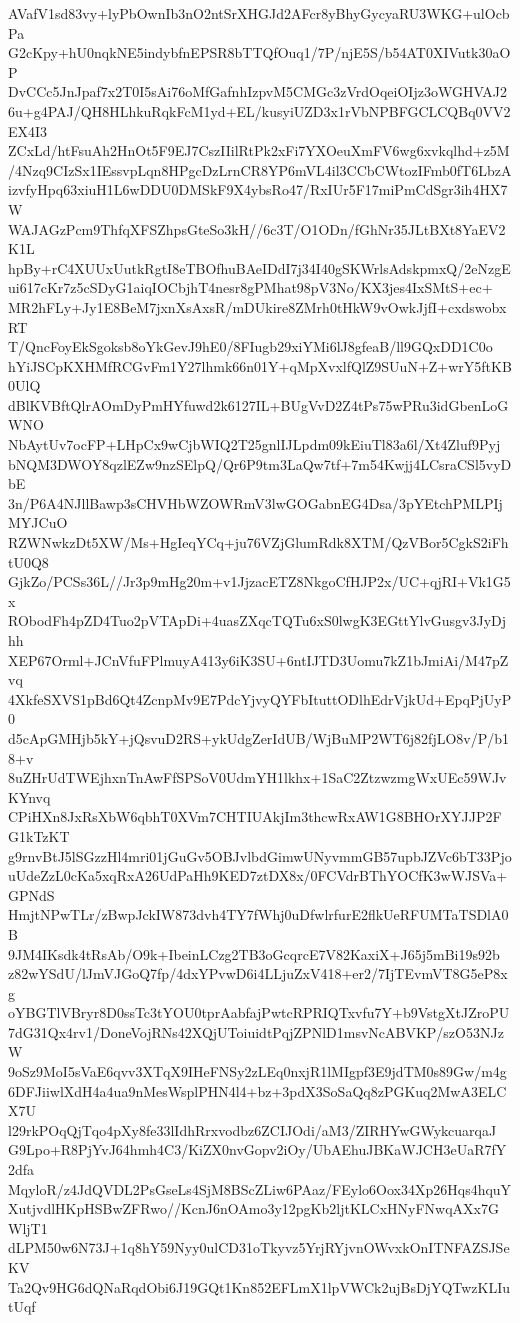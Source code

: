 AVafV1sd83vy+lyPbOwnIb3nO2ntSrXHGJd2AFcr8yBhyGycyaRU3WKG+ulOcbPa
G2cKpy+hU0nqkNE5indybfnEPSR8bTTQfOuq1/7P/njE5S/b54AT0XIVutk30aOP
DvCCc5JnJpaf7x2T0I5sAi76oMfGafnhIzpvM5CMGc3zVrdOqeiOIjz3oWGHVAJ2
6u+g4PAJ/QH8HLhkuRqkFcM1yd+EL/kusyiUZD3x1rVbNPBFGCLCQBq0VV2EX4I3
ZCxLd/htFsuAh2HnOt5F9EJ7CszIIilRtPk2xFi7YXOeuXmFV6wg6xvkqlhd+z5M
/4Nzq9CIzSx1IEssvpLqn8HPgcDzLrnCR8YP6mVL4il3CCbCWtozIFmb0fT6LbzA
izvfyHpq63xiuH1L6wDDU0DMSkF9X4ybsRo47/RxIUr5F17miPmCdSgr3ih4HX7W
WAJAGzPcm9ThfqXFSZhpsGteSo3kH//6c3T/O1ODn/fGhNr35JLtBXt8YaEV2K1L
hpBy+rC4XUUxUutkRgtI8eTBOfhuBAeIDdI7j34I40gSKWrlsAdskpmxQ/2eNzgE
ui617cKr7z5cSDyG1aiqIOCbjhT4nesr8gPMhat98pV3No/KX3jes4IxSMtS+ec+
MR2hFLy+Jy1E8BeM7jxnXsAxsR/mDUkire8ZMrh0tHkW9vOwkJjfI+cxdswobxRT
T/QncFoyEkSgoksb8oYkGevJ9hE0/8FIugb29xiYMi6lJ8gfeaB/ll9GQxDD1C0o
hYiJSCpKXHMfRCGvFm1Y27lhmk66n01Y+qMpXvxlfQlZ9SUuN+Z+wrY5ftKB0UlQ
dBlKVBftQlrAOmDyPmHYfuwd2k6127IL+BUgVvD2Z4tPs75wPRu3idGbenLoGWNO
NbAytUv7ocFP+LHpCx9wCjbWIQ2T25gnlIJLpdm09kEiuTl83a6l/Xt4Zluf9Pyj
bNQM3DWOY8qzlEZw9nzSElpQ/Qr6P9tm3LaQw7tf+7m54Kwjj4LCsraCSl5vyDbE
3n/P6A4NJllBawp3sCHVHbWZOWRmV3lwGOGabnEG4Dsa/3pYEtchPMLPIjMYJCuO
RZWNwkzDt5XW/Ms+HgIeqYCq+ju76VZjGlumRdk8XTM/QzVBor5CgkS2iFhtU0Q8
GjkZo/PCSs36L//Jr3p9mHg20m+v1JjzacETZ8NkgoCfHJP2x/UC+qjRI+Vk1G5x
RObodFh4pZD4Tuo2pVTApDi+4uasZXqcTQTu6xS0lwgK3EGttYlvGusgv3JyDjhh
XEP67Orml+JCnVfuFPlmuyA413y6iK3SU+6ntIJTD3Uomu7kZ1bJmiAi/M47pZvq
4XkfeSXVS1pBd6Qt4ZcnpMv9E7PdcYjvyQYFbItuttODlhEdrVjkUd+EpqPjUyP0
d5cApGMHjb5kY+jQsvuD2RS+ykUdgZerIdUB/WjBuMP2WT6j82fjLO8v/P/b18+v
8uZHrUdTWEjhxnTnAwFfSPSoV0UdmYH1lkhx+1SaC2ZtzwzmgWxUEc59WJvKYnvq
CPiHXn8JxRsXbW6qbhT0XVm7CHTIUAkjIm3thcwRxAW1G8BHOrXYJJP2FG1kTzKT
g9rnvBtJ5lSGzzHl4mri01jGuGv5OBJvlbdGimwUNyvmmGB57upbJZVc6bT33Pjo
uUdeZzL0cKa5xqRxA26UdPaHh9KED7ztDX8x/0FCVdrBThYOCfK3wWJSVa+GPNdS
HmjtNPwTLr/zBwpJckIW873dvh4TY7fWhj0uDfwlrfurE2flkUeRFUMTaTSDlA0B
9JM4IKsdk4tRsAb/O9k+IbeinLCzg2TB3oGcqrcE7V82KaxiX+J65j5mBi19s92b
z82wYSdU/lJmVJGoQ7fp/4dxYPvwD6i4LLjuZxV418+er2/7IjTEvmVT8G5eP8xg
oYBGTlVBryr8D0ssTc3tYOU0tprAabfajPwtcRPRIQTxvfu7Y+b9VstgXtJZroPU
7dG31Qx4rv1/DoneVojRNs42XQjUToiuidtPqjZPNlD1msvNcABVKP/szO53NJzW
9oSz9MoI5sVaE6qvv3XTqX9IHeFNSy2zLEq0nxjR1lMIgpf3E9jdTM0s89Gw/m4g
6DFJiiwlXdH4a4ua9nMesWsplPHN4l4+bz+3pdX3SoSaQq8zPGKuq2MwA3ELCX7U
l29rkPOqQjTqo4pXy8fe33lIdhRrxvodbz6ZCIJOdi/aM3/ZIRHYwGWykcuarqaJ
G9Lpo+R8PjYvJ64hmh4C3/KiZX0nvGopv2iOy/UbAEhuJBKaWJCH3eUaR7fY2dfa
MqyloR/z4JdQVDL2PsGseLs4SjM8BScZLiw6PAaz/FEylo6Oox34Xp26Hqs4hquY
XutjvdlHKpHSBwZFRwo//KcnJ6nOAmo3y12pgKb2ljtKLCxHNyFNwqAXx7GWljT1
dLPM50w6N73J+1q8hY59Nyy0ulCD31oTkyvz5YrjRYjvnOWvxkOnITNFAZSJSeKV
Ta2Qv9HG6dQNaRqdObi6J19GQt1Kn852EFLmX1lpVWCk2ujBsDjYQTwzKLIutUqf
